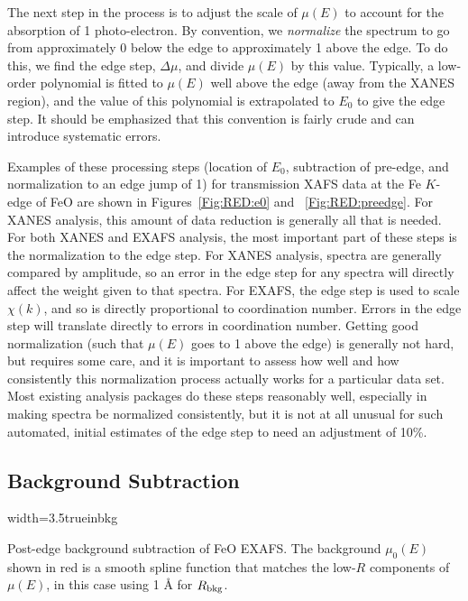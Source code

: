 The next step in the process is to adjust the scale of $\mu(E)$ to account
for the absorption of 1 photo-electron.  By convention, we
{\emph{normalize}} the spectrum to go from approximately 0 below the edge
to approximately 1 above the edge.  To do this, we find the edge step,
$\Delta\mu$, and divide $\mu(E)$ by this value.   Typically, a low-order polynomial
is fitted to $\mu(E)$ well above the edge  (away from the XANES region),
and the value of this polynomial is extrapolated to $E_0$ to give the edge
step.  It should be emphasized that this convention is fairly crude and can
introduce systematic errors.


Examples of these processing steps (location of $E_0$, subtraction of
pre-edge, and normalization to an edge jump of 1) for transmission XAFS
data at the Fe $K$-edge of FeO are shown in Figures~\ref{Fig:RED:e0} and
~\ref{Fig:RED:preedge}.  For XANES analysis, this amount of data reduction
is generally all that is needed.  For both XANES and EXAFS analysis, the
most important part of these steps is the normalization to the edge step.
For XANES analysis, spectra are generally compared by amplitude, so an
error in the edge step for any spectra will directly affect the weight
given to that spectra.  For EXAFS, the edge step is used to scale
$\chi(k)$, and so is directly proportional to coordination number.  Errors
in the edge step will translate directly to errors in coordination number.
Getting good normalization (such that $\mu(E)$ goes to 1 above the edge) is
generally not hard, but requires some care, and it is important to assess
how well and how consistently this normalization process actually works for
a particular data set.  Most existing analysis packages do these steps
reasonably well, especially in making spectra be normalized consistently,
but it is not at all unusual for such automated, initial estimates of the
edge step to need an adjustment of 10\%.


\subsection{Background Subtraction}

\begin{Nfig}{width=3.5truein}{bkg}
  \caption{Post-edge background subtraction of FeO EXAFS. The background
    $\mu_0(E)$ shown in red is a smooth spline function that matches the
    low-$R$ components of $\mu(E)$, in this case using 1 {\AA} for $R_{\rm
      bkg}$.}
  \label{Fig:RED:bkg}
\end{Nfig}

